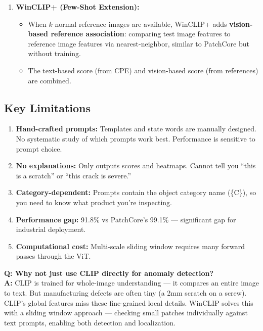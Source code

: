 \documentclass[12pt, a4paper]{article}
\begin{document}
\begin{enumerate}[leftmargin=*]
    \item \textbf{WinCLIP+ (Few-Shot Extension):}
    \begin{itemize}
        \item When $k$ normal reference images are available, WinCLIP+ adds \textbf{vision-based reference association}: comparing test image features to reference image features via nearest-neighbor, similar to PatchCore but without training.
        \item The text-based score (from CPE) and vision-based score (from references) are combined.
    \end{itemize}
\end{enumerate}

\subsection{Key Limitations}
\begin{enumerate}[leftmargin=*]
    \item \textbf{Hand-crafted prompts:} Templates and state words are manually designed. No systematic study of which prompts work best. Performance is sensitive to prompt choice.
    \item \textbf{No explanations:} Only outputs scores and heatmaps. Cannot tell you ``this is a scratch'' or ``this crack is severe.''
    \item \textbf{Category-dependent:} Prompts contain the object category name (\{C\}), so you need to know what product you're inspecting.
    \item \textbf{Performance gap:} 91.8\% vs PatchCore's 99.1\% --- significant gap for industrial deployment.
    \item \textbf{Computational cost:} Multi-scale sliding window requires many forward passes through the ViT.
\end{enumerate}

\begin{vivaqa}
\textbf{Q: Why not just use CLIP directly for anomaly detection?}\\[4pt]
\textbf{A:} CLIP is trained for whole-image understanding --- it compares an entire image to text. But manufacturing defects are often tiny (a 2mm scratch on a screw). CLIP's global features miss these fine-grained local details. WinCLIP solves this with a sliding window approach --- checking small patches individually against text prompts, enabling both detection and localization.
\end{vivaqa}
\end{document}
